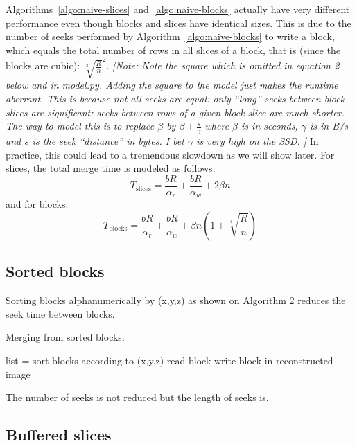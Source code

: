 \documentclass[10pt, conference, compsocconf]{IEEEtran}
\newcommand{\note}[1]{
  \color{blue}\emph{[Note: #1]}
  \color{black}
}
\begin{document}
Algorithms~\ref{algo:naive-slices} and~\ref{algo:naive-blocks}
actually have very different performance even though blocks and slices
have identical sizes. This is due to the number of seeks performed by
Algorithm~\ref{algo:naive-blocks} to write a block, which equals the
total number of rows in all slices of a block, that is (since the
blocks are cubic): $\sqrt[3]{\frac{R}{n}}^2$. \note{Note the square
  which is omitted in equation 2 below and in model.py. Adding the
  square to the model just makes the runtime aberrant. This is because
  not all seeks are equal: only ``long'' seeks between block slices
  are significant; seeks between rows of a given block slice are much
  shorter. The way to model this is to replace $\beta$ by $\beta +
  \frac{s}{\gamma}$ where $\beta$ is in seconds, $\gamma$ is in B/s
  and $s$ is the seek ``distance'' in bytes. I bet $\gamma$ is very
  high on the SSD. } In practice, this could lead to a tremendous
slowdown as we will show later. For slices, the total merge time is
modeled as follows:
\begin{equation}
T_\mathrm{slices} = \frac{bR}{\alpha_r}+\frac{bR}{\alpha_w}+2\beta n
\end{equation}
and for blocks:
\begin{equation}
  T_\mathrm{blocks} = \frac{bR}{\alpha_r}+\frac{bR}{\alpha_w}+\beta n\left(1+\sqrt[3]{\frac{R}{n}}\right)
\end{equation}

\subsection{Sorted blocks}

Sorting blocks alphanumerically by (x,y,z) as shown on Algorithm 2 reduces the seek time
between blocks.

\begin{algorithm}[h]
  \caption{Merging from sorted blocks.}
  \label{algo:sorted-blocks}
  \begin{algorithmic}
    \STATE list = sort blocks according to (x,y,z)
      \STATE read block
      \STATE write block in reconstructed image
    \ENDFOR
  \end{algorithmic}
  \end{algorithm}

The number of seeks is not reduced but the length of seeks is.

\subsection{Buffered slices}
\end{document}
